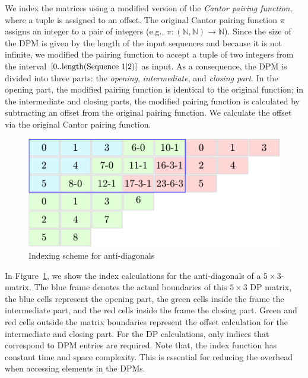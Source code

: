 \documentclass[runningheads,a4paper]{llncs}
\begin{document}
We index the matrices using a modified version of the \textit{Cantor pairing function}, where a tuple is assigned to an offset.
The original Cantor pairing function $\pi$ assigns an integer to a pair of integers (e.g., $\pi: (\mathbb{N}, \mathbb{N}) \rightarrow \mathbb{N}$).
Since the size of the DPM is given by the length of the input sequences and because it is not infinite,
we modified the pairing function to accept a tuple of two integers from the interval $[0..\textrm{length}(\textrm{Sequence 1\textbar2})]$ as input.
As a consequence, the DPM is divided into three parts: the \emph{opening}, \emph{intermediate}, and \emph{closing part}.
In the opening part, the modified pairing function is identical to the original function; in the intermediate and closing parts,
the modified pairing function is calculated by subtracting an offset from the original pairing function.
We calculate the offset via the original Cantor pairing function.

\begin{figure}[ht!]
  \centering
  \includegraphics[scale=0.9]{figures/pairingfunc.pdf}
  \caption{Indexing scheme for anti-diagonals}
  \label{fig:pairingfunc}
\end{figure}

In Figure~\ref{fig:pairingfunc}, we show the index calculations for the anti-diagonals of a $5\times3$-matrix.
The blue frame denotes the actual boundaries of this $5\times3$ DP matrix, the blue cells represent the opening part,
the green cells inside the frame the intermediate part, and the red cells inside the frame the closing part.
Green and red cells outside the matrix boundaries represent the offset calculation for the intermediate and closing part.
For the DP calculations, only indices that correspond to DPM entries are required.
Note that, the index function has constant time and space complexity. This is essential for reducing the overhead when accessing elements in the DPMs.
\end{document}
